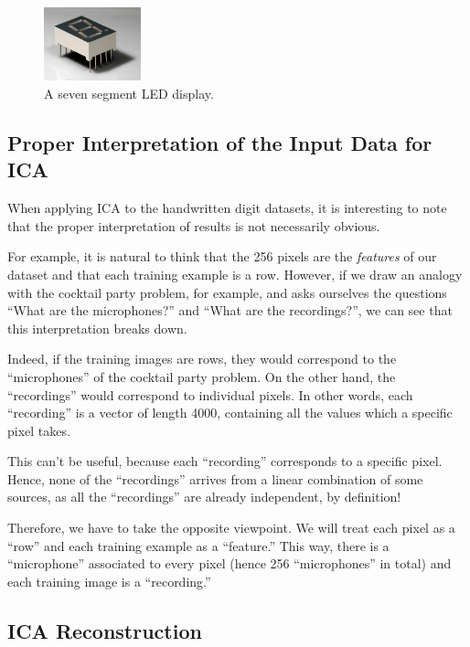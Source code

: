 \documentclass[12pt,article,oneside]{memoir}
\begin{document}
\begin{figure}
	\includegraphics[width=0.25\textwidth]{figures/seven-segment-display.jpg}
	\caption{A seven segment LED display.}
	\label{fig:7-segment-display2}
\end{figure}



\subsection{Proper Interpretation of the Input Data for ICA}

When applying ICA to the handwritten digit datasets, it is interesting to note that the proper interpretation of results is not necessarily obvious.

For example, it is natural to think that the 256 pixels are the \emph{features} of our dataset and that each training example is a row. However, if we draw an analogy with the cocktail party problem, for example, and asks ourselves the questions ``What are the microphones?'' and ``What are the recordings?'', we can see that this interpretation breaks down. 

Indeed, if the training images are rows, they would correspond to the ``microphones'' of the cocktail party problem. On the other hand, the ``recordings'' would correspond to individual pixels. In other words, each ``recording'' is a vector of length 4000, containing all the values which a specific pixel takes.

This can't be useful, because each ``recording'' corresponds to a specific pixel. Hence, none of the ``recordings'' arrives from a linear combination of some sources, as all the ``recordings'' are already independent, by definition!

Therefore, we have to take the opposite viewpoint. We will treat each pixel as a ``row'' and each training example as a ``feature.'' This way, there is a ``microphone'' associated to every pixel (hence 256 ``microphones'' in total) and each training image is a ``recording.''


\subsection{ICA Reconstruction}
\end{document}
